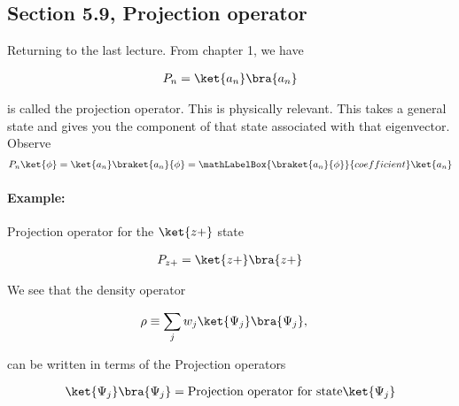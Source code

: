 \subsection{Section 5.9, Projection operator}

Returning to the last lecture.  From chapter 1, we have

\begin{equation}\label{eqn:PHY356Foct26:1000}
\begin{aligned}
P_n = \ket{a_n} \bra{a_n}
\end{aligned}
\end{equation}

is called the projection operator.  This is physically relevant.  This takes a general state and gives you the component of that state associated with that eigenvector.  Observe
\begin{equation}\label{eqn:PHY356Foct26:210}
\begin{aligned}
P_n \ket{\phi} =
\ket{a_n} \braket{a_n}{\phi}
=
\mathLabelBox{\braket{a_n}{\phi}}{coefficient}
\ket{a_n}
\end{aligned}
\end{equation}

\paragraph{Example:} Projection operator for the \(\ket{z+}\) state

\begin{equation}\label{eqn:PHY356Foct26:211}
\begin{aligned}
P_{z+} = \ket{z+} \bra{z+}
\end{aligned}
\end{equation}

We see that the density operator

\begin{equation}\label{eqn:PHY356HNov2:40b}
\begin{aligned}
\rho &\equiv \sum_j w_j \ket{\Psi_j} \bra{\Psi_j},
\end{aligned}
\end{equation}

can be written in terms of the Projection operators

\begin{equation}\label{eqn:lecture8makingSenseOfQM:1120}
\begin{aligned}
\ket{\Psi_j} \bra{\Psi_j} = \text{Projection operator for state} \ket{\Psi_j}
\end{aligned}
\end{equation}

